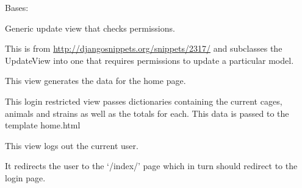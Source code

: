 \documentclass[letterpaper,10pt,english]{sphinxmanual}
\begin{document}

\begin{fulllineitems}
\label{api:mousedb.views.RestrictedUpdateView}
Bases: \href{http://docs.djangoproject.com/en/dev/ref/class-based-views/\#django.views.generic.edit.UpdateView}{}

Generic update view that checks permissions.

This is from \href{http://djangosnippets.org/snippets/2317/}{http://djangosnippets.org/snippets/2317/} and subclasses the UpdateView into one that requires permissions to update a particular model.


\begin{fulllineitems}
\label{api:mousedb.views.RestrictedUpdateView.dispatch}
\end{fulllineitems}


\end{fulllineitems}



\begin{fulllineitems}
\label{api:mousedb.views.home}
This view generates the data for the home page.

This login restricted view passes dictionaries containing the current cages, animals and strains as well as the totals for each.  This data is passed to the template home.html

\end{fulllineitems}



\begin{fulllineitems}
\label{api:mousedb.views.logout_view}
This view logs out the current user.

It redirects the user to the `/index/' page which in turn should redirect to the login page.

\end{fulllineitems}
\end{document}
